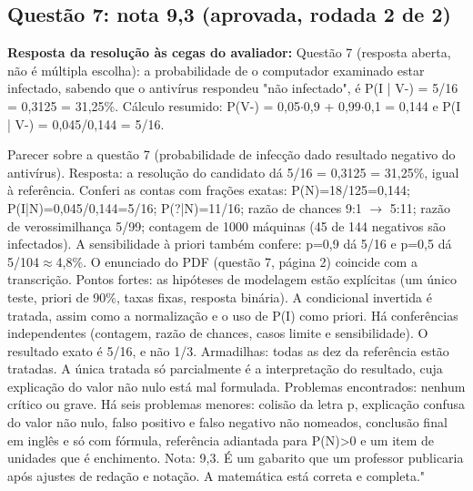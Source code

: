 \documentclass{article}%
\begin{document}
\subsection*{Questão 7: nota 9,3 (aprovada, rodada 2 de 2)}%
\textbf{Resposta da resolução às cegas do avaliador:} Questão 7 (resposta aberta, não é múltipla escolha): a probabilidade de o computador examinado estar infectado, sabendo que o antivírus respondeu "não infectado", é P(I | V{-}) = 5/16 = 0,3125 = 31,25\%.\newline%
\newline%
Cálculo resumido: P(V{-}) = 0,05$\cdot$0,9 + 0,99$\cdot$0,1 = 0,144 e P(I | V{-}) = 0,045/0,144 = 5/16.\par %
Parecer sobre a questão 7 (probabilidade de infecção dado resultado negativo do antivírus).\newline%
\newline%
Resposta: a resolução do candidato dá 5/16 = 0,3125 = 31,25\%, igual à referência. Conferi as contas com frações exatas: P(N)=18/125=0,144; P(I|N)=0,045/0,144=5/16; P(?|N)=11/16; razão de chances 9:1 $\to$ 5:11; razão de verossimilhança 5/99; contagem de 1000 máquinas (45 de 144 negativos são infectados). A sensibilidade à priori também confere: p=0,9 dá 5/16 e p=0,5 dá 5/104$\approx$4,8\%. O enunciado do PDF (questão 7, página 2) coincide com a transcrição.\newline%
\newline%
Pontos fortes: as hipóteses de modelagem estão explícitas (um único teste, priori de 90\%, taxas fixas, resposta binária). A condicional invertida é tratada, assim como a normalização e o uso de P(I) como priori. Há conferências independentes (contagem, razão de chances, casos limite e sensibilidade). O resultado exato é 5/16, e não 1/3.\newline%
\newline%
Armadilhas: todas as dez da referência estão tratadas. A única tratada só parcialmente é a interpretação do resultado, cuja explicação do valor não nulo está mal formulada.\newline%
\newline%
Problemas encontrados: nenhum crítico ou grave. Há seis problemas menores: colisão da letra p, explicação confusa do valor não nulo, falso positivo e falso negativo não nomeados, conclusão final em inglês e só com fórmula, referência adiantada para P(N)>0 e um item de unidades que é enchimento.\newline%
\newline%
Nota: 9,3. É um gabarito que um professor publicaria após ajustes de redação e notação. A matemática está correta e completa."%
\end{document}
